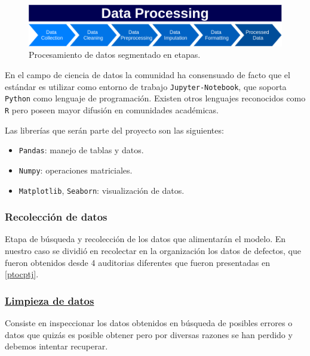 \documentclass[a4paper,12pt]{article}
\begin{document}
		\begin{figure}[H]
			\begin{center}				
				\includegraphics[width=1\textwidth]{dataproc.png}
				\caption{Procesamiento de datos segmentado en etapas.}
				\label{fig:dataproc}
			\end{center}
		\end{figure}
						
		En el campo de ciencia de datos la comunidad ha consensuado de facto que el estándar es utilizar como entorno de trabajo \texttt{Jupyter-Notebook}, que soporta \texttt{Python} como lenguaje de programación. Existen otros lenguajes reconocidos como \texttt{R} pero poseen mayor difusión en comunidades académicas.
						
		Las librerías que serán parte del proyecto son las siguientes: 
		\begin{itemize}[noitemsep, topsep=2pt]
			\item \texttt{Pandas}: manejo de tablas y datos.
			\item \texttt{Numpy}: operaciones matriciales.
			\item \texttt{Matplotlib}, \texttt{Seaborn}: visualización de datos.
		\end{itemize}
						
		\subsubsection{Recolección de datos}
						
		Etapa de búsqueda y recolección de los datos que alimentarán el modelo. En nuestro caso se dividió en recolectar en la organización los datos de defectos, que fueron obtenidos desde 4 auditorias diferentes que fueron presentadas en \ref{ptocptj}.
						
		\subsubsection{\href{https://github.com/GeraCollante/tesis-icomp-machinelearning/blob/main/DataCleaning.ipynb}{\color{blue}Limpieza de datos}} \label{DataCleaning}
		Consiste en inspeccionar los datos obtenidos en búsqueda de posibles errores o datos que quizás es posible obtener pero por diversas razones se han perdido y debemos intentar recuperar.
						
\end{document}
